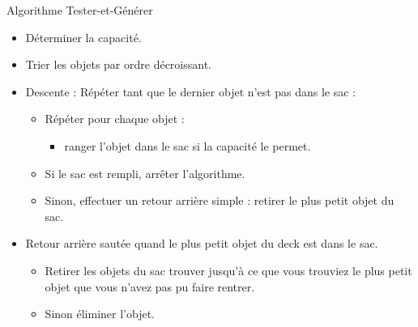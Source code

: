 \documentclass[11pt]{article}
\begin{document}
  \begin{algorithme}{Algorithme Tester-et-Générer}
    \begin{itemize}
    \item Déterminer la capacité.
    \item Trier les objets par ordre décroissant.
    \item  Descente : Répéter tant que le dernier objet n'est pas dans le sac :
      \begin{itemize}
      \item Répéter pour chaque objet :
        \begin{itemize}
        \item ranger l'objet dans le sac si la capacité le permet.
        \end{itemize}
      \item Si le sac est rempli, arrêter l'algorithme.
      \item Sinon, effectuer un retour arrière simple : retirer le plus petit objet du sac.
        \end{itemize}
      \item Retour arrière sautée quand le plus petit objet du deck est dans le sac.
      \begin{itemize}
      \item Retirer les objets du sac trouver jusqu'à ce que vous trouviez le plus petit objet que vous n'avez pas pu faire rentrer.


      \item Sinon éliminer l'objet.
      \end{itemize}
    \end{itemize}
  \end{algorithme}
\end{document}
